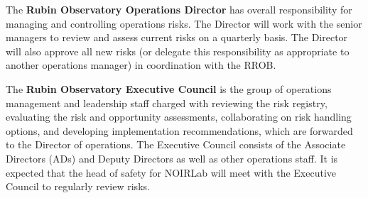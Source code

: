 The \textbf{Rubin Observatory Operations Director} has overall responsibility for managing and controlling operations risks.
The Director will work with the senior managers to review and assess current risks on a quarterly basis.
The Director will also approve all new risks (or delegate this responsibility as appropriate to another operations manager) in coordination with the RROB.

The \textbf{Rubin Observatory Executive Council} is the group of operations management and leadership staff charged with reviewing the risk registry, evaluating the risk and opportunity assessments, collaborating on risk handling options, and developing implementation recommendations, which are forwarded to the Director of operations.
The Executive Council consists of the Associate Directors (ADs) and Deputy Directors as well as other operations staff.
It is expected that the head of safety for NOIRLab will meet with the Executive Council to regularly review risks.

